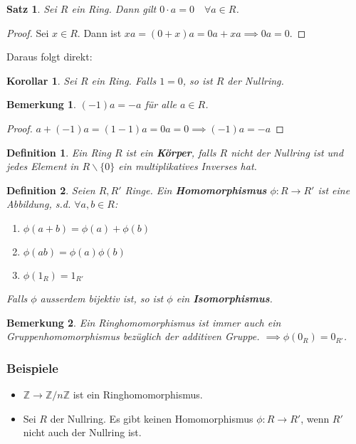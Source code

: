 \documentclass{article}
\theoremstyle{plain}
\newtheorem{definition}{Definition}
\newtheorem{theorem}{Satz}
\newtheorem{corollary}{Korollar}
\newtheorem{bemerkung}{Bemerkung}
\newcommand{\defn}[1]{\textbf{#1}}
\newcommand{\Z}{\mathbb{Z}}
\begin{document}
\begin{theorem}
    Sei $R$ ein Ring. Dann gilt $0\cdot a=0 \quad \forall a\in R$.
\end{theorem}
\begin{proof}
    Sei $x\in R$. Dann ist $xa = (0+x)a = 0a + xa \implies 0a=0$.
\end{proof}
Daraus folgt direkt:
\begin{corollary}
    Sei $R$ ein Ring. Falls $1=0$, so ist $R$ der Nullring.
\end{corollary}
\begin{bemerkung}
    $(-1)a=-a$ für alle $a\in R$.
\end{bemerkung}
\begin{proof}
    $a+(-1)a = (1-1)a=0a=0 \implies (-1)a=-a$
\end{proof}
\begin{definition}
    Ein Ring $R$ ist ein \defn{Körper}, falls $R$ nicht der Nullring ist und jedes Element in $R\backslash\{0\}$ ein multiplikatives Inverses hat.
\end{definition}

\begin{definition}
    Seien $R, R'$ Ringe. Ein \defn{Homomorphismus} $\phi\colon R\to R'$ ist eine Abbildung, s.d. $\forall a,b\in R$:
    \begin{enumerate}[label=(\arabic*)]
        \item $\phi(a+b)=\phi(a)+\phi(b)$
        \item $\phi(ab) = \phi(a)\phi(b)$
        \item $\phi(1_R)=1_{R'}$
    \end{enumerate}
    Falls $\phi$ ausserdem bijektiv ist, so ist $\phi$ ein \defn{Isomorphismus}.
\end{definition}

\begin{bemerkung}
    Ein Ringhomomorphismus ist immer auch ein Gruppenhomomorphismus bezüglich der additiven Gruppe. $\implies \phi(0_R)=0_{R'}$.
\end{bemerkung}

\subsubsection*{Beispiele}
\begin{itemize}
    \item $\Z\to\Z/n\Z$ ist ein Ringhomomorphismus.
    \item Sei $R$ der Nullring. Es gibt keinen Homomorphismus $\phi\colon R\to R'$, wenn $R'$ nicht auch der Nullring ist.
\end{itemize}
\end{document}
